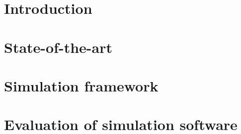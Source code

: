 \documentclass[draft,final]{vutinfth} %
\begin{document}
\frontmatter %

\addstatementpage

\begin{danksagung*}

\end{danksagung*}

\begin{acknowledgements*}

\end{acknowledgements*}

\begin{kurzfassung}

\end{kurzfassung}

\begin{abstract}

\end{abstract}


\tableofcontents %

\mainmatter

\chapter{Introduction}


\chapter{State-of-the-art} \label{chap:state}


\chapter{Simulation framework}


\chapter{Evaluation of simulation software}

\end{document}
